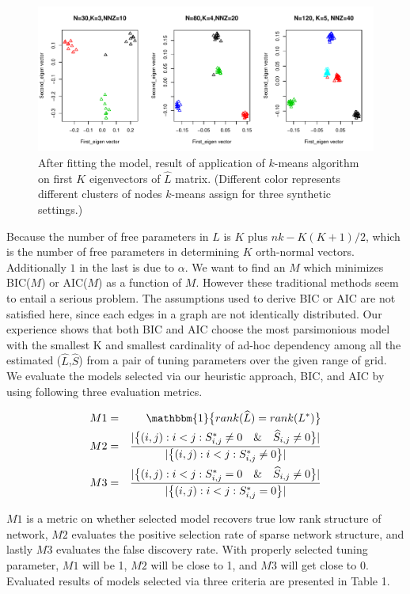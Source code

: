 \documentclass[AMS,STIX1COL]{WileyNJD-v2}
\begin{document}
\begin{figure}[htbp]
\includegraphics[width=1\textwidth]{Fig1.pdf}
\caption{After fitting the model, result of application of $k$-means algorithm on first $K$ eigenvectors of $\widehat{L}$ matrix. (Different color represents different clusters of nodes $k$-means assign for three synthetic settings.) }
\label{fig:figure1}
\end{figure}

Because the number of free parameters in $L$ is $K$ plus $nk - K(K+1)/2$, which is the number of free parameters in determining $K$ orth-normal vectors.
Additionally $1$ in the last is due to $\alpha$.
We want to find an $M$ which minimizes BIC($M$) or AIC($M$) as a function of $M$.
However these traditional methods seem to entail a serious problem.
The assumptions used to derive BIC or AIC are not satisfied here, since each edges in a graph are not identically distributed.
Our experience shows that both BIC and AIC choose the most parsimonious model with the smallest K and smallest cardinality of ad-hoc dependency among all the estimated ($\widehat{L}$,$\widehat{S}$) from a pair of tuning parameters over the given range of grid.
We evaluate the models selected via our heuristic approach, BIC, and AIC by using following three evaluation metrics.

\begin{eqnarray*}
M1 &=& \mathbbm{1}\big\{rank(\widehat{L}) = rank(L^{*})\big\} \\
M2 &=& \frac{|\big\{(i,j):i<j:S^{*}_{i,j} \neq0 \quad \& \quad \widehat{S}_{i,j} \neq 0 \big\}|}{|\big\{(i,j):i<j:S^{*}_{i,j}\neq0\big\}|} \\
M3 &=& \frac{|\big\{(i,j):i<j:S^{*}_{i,j} = 0 \quad \& \quad \widehat{S}_{i,j} \neq 0 \big\}|}{|\big\{(i,j):i<j:S^{*}_{i,j}=0\big\}|}
\end{eqnarray*}

$M1$ is a metric on whether selected model recovers true low rank structure of network,
$M2$ evaluates the positive selection rate of sparse network structure,
and lastly $M3$ evaluates the false discovery rate.
With properly selected tuning parameter, $M1$ will be 1, $M2$ will be close to 1, and $M3$ will get close to 0.
Evaluated results of models selected via three criteria are presented in Table 1.
\end{document}
